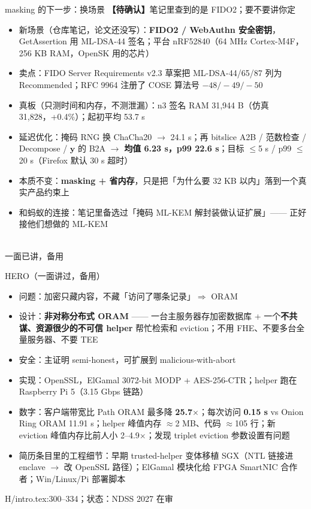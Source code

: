\documentclass[aspectratio=169,10pt,fontset=none]{ctexbeamer}
\newcommand{\warn}[1]{{\color{warn}\textbf{【待确认】}#1}}
\newcommand{\src}[1]{{\scriptsize\color{gray}#1}}
\begin{document}
\begin{frame}{masking 的下一步：换场景 \warn{笔记里查到的是 FIDO2；要不要讲你定}}
\begin{itemize}
  \item 新场景（仓库笔记，论文还没写）：\textbf{FIDO2 / WebAuthn 安全密钥}，GetAssertion 用 ML-DSA-44 签名；平台 nRF52840（64 MHz Cortex-M4F，256 KB RAM，OpenSK 用的芯片）
  \item 卖点：FIDO Server Requirements v2.3 草案把 ML-DSA-44/65/87 列为 Recommended；RFC 9964 注册了 COSE 算法号 $-48/-49/-50$
  \item 真板（只测时间和内存，不测泄漏）：n3 签名 RAM 31,944 B（仿真 31,828，+0.4\%）；起初平均 53.7 s
  \item 延迟优化：掩码 RNG 换 ChaCha20 $\to$ 24.1 s；再 bitslice A2B / 范数检查 / Decompose / $\mathbf y$ 的 B2A $\to$ \textbf{均值 6.23 s，p99 22.6 s}；目标 $\le$5 s / p99 $\le$20 s（Firefox 默认 30 s 超时）
  \item 本质不变：\textbf{masking + 省内存}，只是把「为什么要 32 KB 以内」落到一个真实产品约束上
  \item 和蚂蚁的连接：笔记里备选过「掩码 ML-KEM 解封装做认证扩展」—— 正好接他们想做的 ML-KEM
\end{itemize}
\end{frame}
\begin{frame}
\vfill{}\\[6pt]{\normalsize 一面已讲，备用}\vfill
\end{frame}
\begin{frame}{HERO（一面讲过，备用）}
\begin{itemize}
  \item 问题：加密只藏内容，不藏「访问了哪条记录」$\Rightarrow$ ORAM
  \item 设计：\textbf{非对称分布式 ORAM} —— 一台主服务器存加密数据库 + 一个\textbf{不共谋、资源很少的不可信 helper} 帮忙检索和 eviction；不用 FHE、不要多台全量服务器、不要 TEE
  \item 安全：主证明 semi-honest，可扩展到 malicious-with-abort
  \item 实现：OpenSSL，ElGamal 3072-bit MODP + AES-256-CTR；helper 跑在 Raspberry Pi 5（3.15 Gbps 链路）
  \item 数字：客户端带宽比 Path ORAM 最多降 \textbf{25.7$\times$}；每次访问 \textbf{0.15 s} vs Onion Ring ORAM 11.91 s；helper 峰值内存 $\approx$2 MB、代码 $\approx$105 行；新 eviction 峰值内存比前人小 2--4.9$\times$；发现 triplet eviction 参数设置有问题
  \item 简历条目里的工程细节：早期 trusted-helper 变体移植 SGX（NTL 链接进 enclave $\to$ 改 OpenSSL 路径）；ElGamal 模块化给 FPGA SmartNIC 合作者；Win/Linux/Pi 部署脚本
\end{itemize}
\src{H/intro.tex:300--334；状态：NDSS 2027 在审}
\end{frame}
\end{document}
